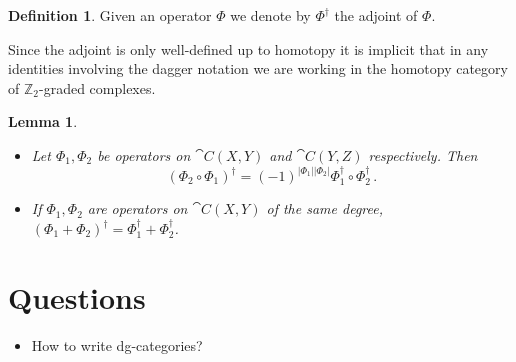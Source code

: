 \documentclass{compositio}
\newtheorem{lemma}[theorem]{Lemma}
\theoremstyle{definition}
\newtheorem{definition}[theorem]{Definition}
\numberwithin{equation}{section}
\begin{document}
\begin{definition} Given an operator $\Phi$ we denote by $\Phi^{\dagger}$ the adjoint of $\Phi$.
\end{definition}

Since the adjoint is only well-defined up to homotopy it is implicit that in any identities involving the dagger notation we are working in the homotopy category of $\mathbb{Z}_2$-graded complexes.

\begin{lemma} 
\begin{itemize}
\item[(i)] Let $\Phi_1, \Phi_2$ be operators on $\cat{C}(X,Y)$ and $\cat{C}(Y,Z)$ respectively. Then
\[
(\Phi_2 \circ \Phi_1)^{\dagger} = (-1)^{|\Phi_1||\Phi_2|} \Phi_1^{\dagger} \circ \Phi_2^{\dagger}\,.
\]
\item[(ii)] If $\Phi_1, \Phi_2$ are operators on $\cat{C}(X,Y)$ of the same degree, $(\Phi_1 + \Phi_2)^{\dagger} = \Phi_1^{\dagger} + \Phi_2^{\dagger}$.
\end{itemize}
\end{lemma}

\newpage

\section{Questions}

\begin{itemize}
\item How to write dg-categories?
\end{itemize}
\end{document}
